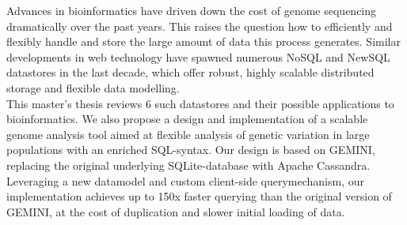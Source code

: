 Advances in bioinformatics have driven down the cost of genome sequencing dramatically over the past years. This raises the question how to efficiently and flexibly handle and store the large amount of data this process generates. Similar developments in web technology have spawned numerous NoSQL and NewSQL datastores in the last decade, which offer robust, highly scalable distributed storage and flexible data modelling. \\
This master's thesis reviews 6 such datastores and their possible applications to bioinformatics. We also propose a design and implementation of a scalable genome analysis tool aimed at flexible analysis of genetic variation in large populations with an enriched SQL-syntax. Our design is based on GEMINI, replacing the original underlying SQLite-database with Apache Cassandra.\\
Leveraging a new datamodel and custom client-side querymechanism, our implementation achieves up to 150x faster querying than the original version of GEMINI, at the cost of duplication and slower initial loading of data.
